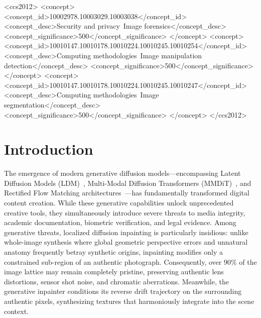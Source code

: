 \documentclass[sigconf,review=true]{acmart}
\begin{document}
\begin{CCSXML}
<ccs2012>
   <concept>
       <concept_id>10002978.10003029.10003038</concept_id>
       <concept_desc>Security and privacy~Image forensics</concept_desc>
       <concept_significance>500</concept_significance>
       </concept>
   <concept>
       <concept_id>10010147.10010178.10010224.10010245.10010254</concept_id>
       <concept_desc>Computing methodologies~Image manipulation detection</concept_desc>
       <concept_significance>500</concept_significance>
       </concept>
   <concept>
       <concept_id>10010147.10010178.10010224.10010245.10010247</concept_id>
       <concept_desc>Computing methodologies~Image segmentation</concept_desc>
       <concept_significance>500</concept_significance>
       </concept>
 </ccs2012>
\end{CCSXML}



\maketitle

\section{Introduction}
\label{sec:intro}

The emergence of modern generative diffusion models---encompassing Latent Diffusion Models (LDM)~\cite{ldm}, Multi-Modal Diffusion Transformers (MMDiT)~\cite{dit}, and Rectified Flow Matching architectures~\cite{flux}---has fundamentally transformed digital content creation. While these generative capabilities unlock unprecedented creative tools, they simultaneously introduce severe threats to media integrity, academic documentation, biometric verification, and legal evidence. Among generative threats, localized diffusion inpainting is particularly insidious: unlike whole-image synthesis where global geometric perspective errors and unnatural anatomy frequently betray synthetic origins, inpainting modifies only a constrained sub-region of an authentic photograph. Consequently, over $90\%$ of the image lattice may remain completely pristine, preserving authentic lens distortions, sensor shot noise, and chromatic aberrations. Meanwhile, the generative inpainter conditions its reverse drift trajectory on the surrounding authentic pixels, synthesizing textures that harmoniously integrate into the scene context.
\end{document}
